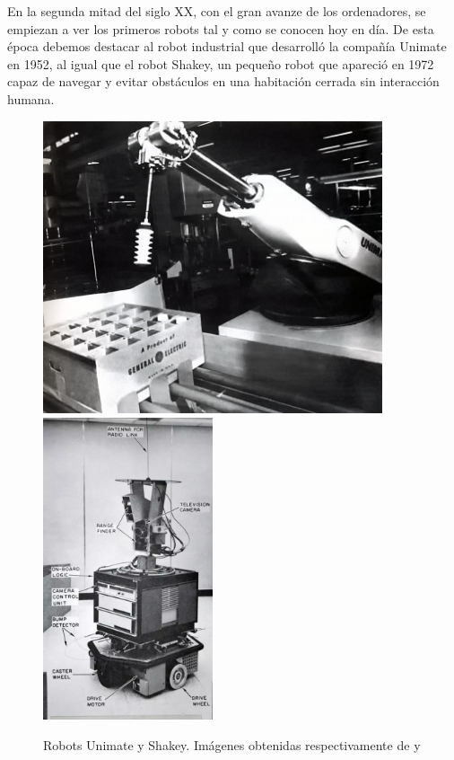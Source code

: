 En la segunda mitad del siglo XX, con el gran avanze de los ordenadores, se empiezan a ver los primeros robots tal y como se conocen hoy en día.
De esta época debemos destacar al robot industrial que desarrolló la compañía Unimate en 1952, al igual que el robot Shakey, un pequeño robot que apareció
en 1972 capaz de navegar y evitar obstáculos en una habitación cerrada sin interacción humana.

\begin{figure} [H]
  \begin{center}
    \includegraphics[width=10cm]{figs/c1/unimate.jpg}
    \includegraphics[width=5cm]{figs/c1/shakey.jpg}
  \end{center}
  \caption[Robots Unimate y Shakey]{Robots Unimate y Shakey. Imágenes obtenidas respectivamente de \cite{unimate} y \cite{shakey}}
  \label{fig:unimate_shakey}
\end{figure}

